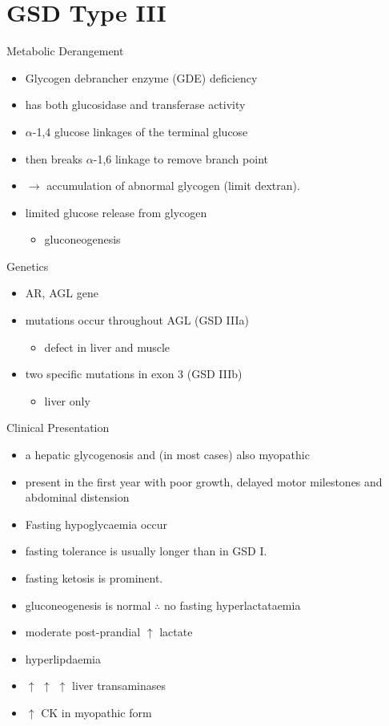 \documentclass[presentation, smaller]{beamer}
\begin{document}
\section{GSD Type III}
\label{sec:orgd6d31ef}
\begin{frame}[label={sec:org43556bf}]{Metabolic Derangement}
\begin{itemize}
\item Glycogen debrancher enzyme (GDE) deficiency
\item has both glucosidase and transferase activity
\item \(\alpha\)-1,4 glucose linkages of the terminal glucose
\item then breaks \(\alpha\)-1,6 linkage to remove branch point
\item \(\to\) accumulation of abnormal glycogen (limit dextran).
\item limited glucose release from glycogen
\begin{itemize}
\item gluconeogenesis
\end{itemize}
\end{itemize}
\end{frame}
\begin{frame}[label={sec:org8d69db4}]{Genetics}
\begin{itemize}
\item AR, AGL gene
\item mutations occur throughout AGL (GSD IIIa)
\begin{itemize}
\item defect in liver and muscle
\end{itemize}
\item two specific mutations in exon 3 (GSD IIIb)
\begin{itemize}
\item liver only
\end{itemize}
\end{itemize}
\end{frame}
\begin{frame}[label={sec:org5226680}]{Clinical Presentation}
\begin{itemize}
\item a hepatic glycogenosis and (in most cases) also myopathic
\item present in the first year with poor growth, delayed motor milestones
and abdominal distension
\item Fasting hypoglycaemia occur
\item fasting tolerance is usually longer than in GSD I.
\item fasting ketosis is prominent.
\item gluconeogenesis is normal \(\therefore\) no fasting hyperlactataemia
\item moderate post-prandial \(\uparrow\) lactate
\item hyperlipdaemia
\item \(\uparrow\) \(\uparrow\) \(\uparrow\) liver transaminases
\item \(\uparrow\) CK in myopathic form
\end{itemize}
\end{frame}
\end{document}
